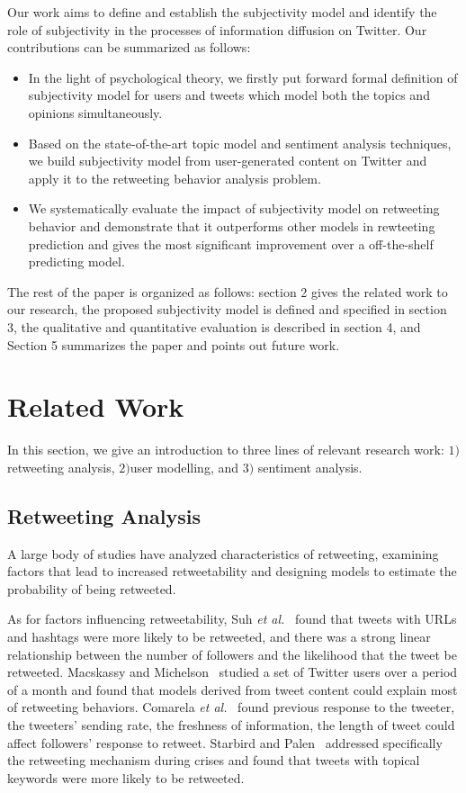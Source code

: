 \documentclass[smallcondensed]{svjour3}     %
\begin{document}
Our work aims to define and establish the subjectivity model  and identify the role of subjectivity in the processes of information diffusion on Twitter. Our contributions can be summarized as follows:
\begin{itemize}
\item In the light of psychological theory, we firstly put forward formal definition of subjectivity model  for users and tweets which model both the topics and opinions simultaneously.
\item Based on the state-of-the-art topic model and sentiment analysis techniques, we build subjectivity model  from user-generated content on Twitter and apply it to the retweeting behavior analysis problem.
\item We systematically evaluate the impact of subjectivity model  on retweeting behavior and demonstrate that it outperforms other models in rewteeting prediction and gives the most significant improvement over a off-the-shelf predicting model. 
\end{itemize}
The rest of the paper is organized as follows: section 2 gives the related work to our research, the proposed subjectivity model  is defined and specified in section 3, the qualitative and quantitative evaluation is described in section 4, and Section 5 summarizes the paper and points out future work.

\section{Related Work}
\label{relatedwork}
In this section, we give an introduction to three lines of relevant research work: $ 1) $ retweeting analysis, $ 2) $user modelling, and $  3)$ sentiment analysis. 
\subsection{Retweeting Analysis}
A large body of studies have analyzed characteristics of retweeting, examining factors that lead to increased retweetability and designing models to estimate the probability of being retweeted. 

As for factors influencing retweetability, Suh \emph{et al.}~\cite{Suh2010} found that tweets with URLs and hashtags were more likely to be retweeted, and there was a strong linear relationship between the number of followers and the likelihood that the tweet be retweeted. 
Macskassy and Michelson~\cite{conf/icwsm/MacskassyM11} studied a set of Twitter users over a period of a month and found that models derived from tweet content could explain most of retweeting behaviors.
Comarela \emph{et al.}~\cite{Comarela:2012UFA} found previous response to the tweeter, the tweeters’ sending rate, the freshness of information, the length of tweet could affect followers’ response to retweet. 
Starbird and Palen~\cite{Starbird:2012RRI} addressed specifically the retweeting mechanism during crises and found that tweets with topical keywords were more likely to be retweeted. 
\end{document}
